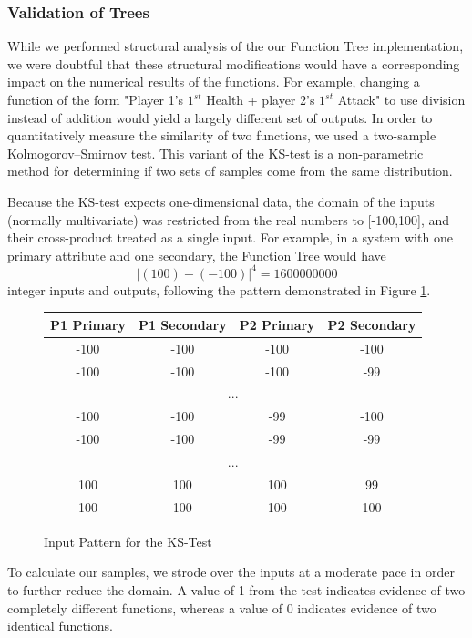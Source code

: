 \documentclass{acm_proc_article-sp}
\begin{document}
    \subsubsection{Validation of Trees}
    
While we performed structural analysis of the our Function Tree implementation, we were doubtful that these structural modifications would have a corresponding impact on the numerical results of the functions. For example, changing a function of the form "Player 1's $1^{st}$ Health + player 2's $1^{st}$ Attack" to use division instead of addition would yield a largely different set of outputs. In order to quantitatively measure the similarity of two functions, we used a two-sample Kolmogorov–Smirnov test. This variant of the KS-test is a non-parametric method for determining if two sets of samples come from the same distribution\cite{ks-test}. 

Because the KS-test expects one-dimensional data, the domain of the inputs (normally multivariate) was restricted from the real numbers to [-100,100], and their cross-product treated as a single input. For example, in a system with one primary attribute and one secondary, the Function Tree would have $$|(100) - (-100)|^4 = 1600000000$$ integer inputs and outputs, following the pattern demonstrated in Figure \ref{ks-test-inputs}.

    \begin{figure}[h]
        \centering
\begin{tabular}{ | c | c | c | c | }
    \hline
    P1 Primary & P1 Secondary & P2 Primary & P2 Secondary  \\ \hline
    -100 & -100 & -100 & -100 \\ \hline
    -100 & -100 & -100 & -99 \\ \hline
    \multicolumn{4}{|c|}{...} \\ \hline
    -100 & -100 & -99 & -100 \\ \hline
    -100 & -100 & -99 & -99 \\ \hline
    \multicolumn{4}{|c|}{...} \\ \hline
    100 & 100 & 100 & 99 \\ \hline
    100 & 100 & 100 & 100 \\ \hline
    \hline
\end{tabular}
        \caption{Input Pattern for the KS-Test}
        \label{ks-test-inputs}
    \end{figure}

To calculate our samples, we strode over the inputs at a moderate pace in order to further reduce the domain. A value of 1 from the test indicates evidence of two completely different functions, whereas a value of 0 indicates evidence of two identical functions.
\end{document}
